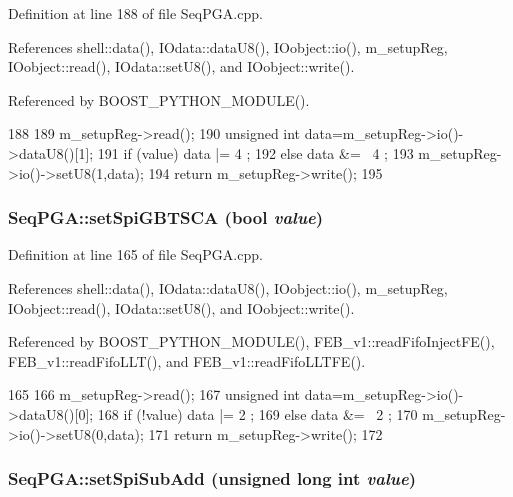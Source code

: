 Definition at line 188 of file SeqPGA.cpp.

References shell::data(), IOdata::dataU8(), IOobject::io(), m\_\-setupReg, IOobject::read(), IOdata::setU8(), and IOobject::write().

Referenced by BOOST\_\-PYTHON\_\-MODULE().


\begin{DoxyCode}
188                                            {
189   m_setupReg->read();
190   unsigned int data=m_setupReg->io()->dataU8()[1];
191   if (value)  data |=  4 ;
192   else        data &= ~4 ;
193   m_setupReg->io()->setU8(1,data);
194   return m_setupReg->write();
195 }
\end{DoxyCode}
\hypertarget{classSeqPGA_ae5449d6970bffd8de3670a8a1ce6942d}{
\subsubsection[{setSpiGBTSCA}]{ SeqPGA::setSpiGBTSCA (bool {\em value})}}
\label{classSeqPGA_ae5449d6970bffd8de3670a8a1ce6942d}


Definition at line 165 of file SeqPGA.cpp.

References shell::data(), IOdata::dataU8(), IOobject::io(), m\_\-setupReg, IOobject::read(), IOdata::setU8(), and IOobject::write().

Referenced by BOOST\_\-PYTHON\_\-MODULE(), FEB\_\-v1::readFifoInjectFE(), FEB\_\-v1::readFifoLLT(), and FEB\_\-v1::readFifoLLTFE().


\begin{DoxyCode}
165                                            {
166   m_setupReg->read();
167   unsigned int data=m_setupReg->io()->dataU8()[0];
168   if (!value) data |=  2 ;
169   else        data &= ~2 ;
170   m_setupReg->io()->setU8(0,data);
171   return m_setupReg->write();
172 }
\end{DoxyCode}
\hypertarget{classSeqPGA_a5db205f213770dd3fb3fcfb8ff7981df}{
\subsubsection[{setSpiSubAdd}]{ SeqPGA::setSpiSubAdd (unsigned long int {\em value})}}
\label{classSeqPGA_a5db205f213770dd3fb3fcfb8ff7981df}


